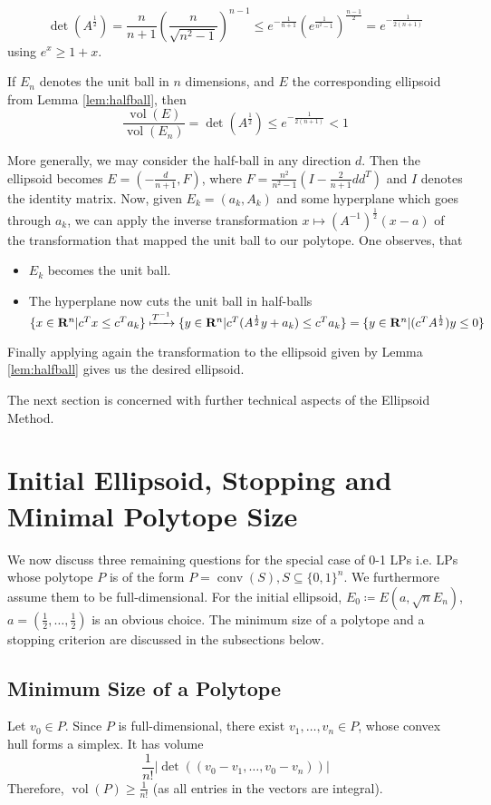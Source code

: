 \documentclass[10pt]{article}
\newcommand{\R}{\mathbf{R}}
\newcommand{\transpose}{T}
\newcommand{\vol}{\operatorname{vol}}
\newcommand{\conv}{\operatorname{conv}}
\begin{document}
\[
\det (A^{\frac{1}{2}}) = \frac{n}{n+1} (\frac{n}{\sqrt{n^2-1}})^{n-1} \le e^{-\frac{1}{n+1}} (e^{\frac{1}{n^2-1}})^{\frac{n-1}{2}} = e^{-\frac{1}{2(n+1)}}
\]
using $e^x \geq 1 + x$.
\begin{corollary}
If $E_n$ denotes the unit ball in $n$ dimensions, and $E$ the corresponding ellipsoid from Lemma \ref{lem:halfball}, then
\[
\frac{\vol (E)}{\vol (E_n)} = \det (A^{\frac{1}{2}}) \le e^{-\frac{1}{2(n+1)}}<1
\]
\end{corollary}
More generally, we may consider the half-ball in any direction $d$. Then the ellipsoid becomes $E = (-\frac{d}{n+1}, F)$, where $F = \frac{n^2}{n^2-1} (I - \frac{2}{n+1} dd^\transpose)$ and $I$ denotes the identity matrix. Now, given $E_k = (a_k, A_k)$ and some hyperplane which goes through $a_k$, we can apply the inverse transformation $x \mapsto (A^{-1})^{\frac{1}{2}} (x-a)$ of the transformation that mapped the unit ball to our polytope. One observes, that
\begin{itemize}
\item $E_k$ becomes the unit ball. 
\item The hyperplane now cuts the unit ball in half-balls $\{x\in \R^n | c^\transpose x \le c^\transpose a_k \} \xmapsto{T^{-1}} \{y\in \R^n | c^\transpose (A^{\frac{1}{2}} y + a_k ) \le c^\transpose a_k\} = \{y \in \R^n | (c^\transpose A^{\frac{1}{2}}) y \le 0 \}$
\end{itemize}
Finally applying again the transformation to the ellipsoid given by Lemma \ref{lem:halfball} gives us the desired ellipsoid.

The next section is concerned with further technical aspects of the Ellipsoid Method.
\section{Initial Ellipsoid, Stopping and Minimal Polytope Size}
We now discuss three remaining questions for the special case of 0-1 LPs i.e. LPs whose polytope $P$ is of the form $P = \conv (S), S \subseteq \{0,1\}^n$. We furthermore assume them to be full-dimensional. For the initial ellipsoid, $E_0 \coloneqq E(a,\sqrt{n}E_n)$, $a=(\frac{1}{2}, \dots, \frac{1}{2})$ is an obvious choice. The minimum size of a polytope and a stopping criterion are discussed in the subsections below.
\subsection{Minimum Size of a Polytope}
Let $v_0 \in P$. Since $P$ is full-dimensional, there exist $v_1, \dots, v_n \in P$, whose convex hull forms a simplex. It has volume
\[
\frac{1}{n!} \left\lvert\det ((v_0-v_1, \dots, v_0-v_n))\right\rvert
\]
Therefore, $\vol (P) \ge \frac{1}{n!}$ (as all entries in the vectors are integral).
\end{document}
